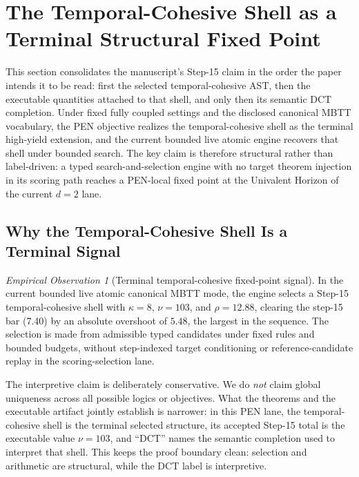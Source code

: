 \documentclass[11pt,a4paper]{article}
\theoremstyle{plain}
\theoremstyle{definition}
\theoremstyle{remark}
\newtheorem{observation}[theorem]{Empirical Observation}
\begin{document}
\section{The Temporal-Cohesive Shell as a Terminal Structural Fixed Point}
\label{sec:decomposition}
\label{sec:dct-discovery}

This section consolidates the manuscript's Step-15 claim in the order the paper intends it to be read: first the selected temporal-cohesive AST, then the executable quantities attached to that shell, and only then its semantic DCT completion.
Under fixed fully coupled settings and the disclosed canonical MBTT vocabulary, the PEN objective realizes the temporal-cohesive shell as the terminal high-yield extension, and the current bounded live atomic engine recovers that shell under bounded search.
The key claim is therefore structural rather than label-driven: a typed search-and-selection engine with no target theorem injection in its scoring path reaches a PEN-local fixed point at the Univalent Horizon of the current $d=2$ lane.

\subsection{Why the Temporal-Cohesive Shell Is a Terminal Signal}

\begin{observation}[Terminal temporal-cohesive fixed-point signal]
\label{thm:spectral}
In the current bounded live atomic canonical MBTT mode, the engine selects a Step-15 temporal-cohesive shell with $\kappa=8$, $\nu=103$, and $\rho=12.88$, clearing the step-15 bar (7.40) by an absolute overshoot of $5.48$, the largest in the sequence.
The selection is made from admissible typed candidates under fixed rules and bounded budgets, without step-indexed target conditioning or reference-candidate replay in the scoring-selection lane.
\end{observation}

The interpretive claim is deliberately conservative.
We do \emph{not} claim global uniqueness across all possible logics or objectives.
What the theorems and the executable artifact jointly establish is narrower: in this PEN lane, the temporal-cohesive shell is the terminal selected structure, its accepted Step-15 total is the executable value $\nu=103$, and ``DCT'' names the semantic completion used to interpret that shell.
This keeps the proof boundary clean: selection and arithmetic are structural, while the DCT label is interpretive.
\end{document}
